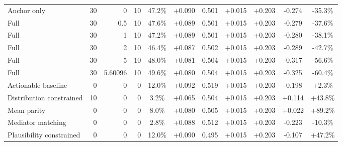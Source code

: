 \begin{table}[htbp]
\begin{tabular}{lrrrccccccc}
Anchor only & 30 & 0 & 10 & 47.2\% & +0.090 & 0.501 & +0.015 & +0.203 & -0.274 & -35.3\% \\
Full & 30 & 0.5 & 10 & 47.6\% & +0.089 & 0.501 & +0.015 & +0.203 & -0.279 & -37.6\% \\
Full & 30 & 1 & 10 & 47.2\% & +0.089 & 0.501 & +0.015 & +0.203 & -0.280 & -38.1\% \\
Full & 30 & 2 & 10 & 46.4\% & +0.087 & 0.502 & +0.015 & +0.203 & -0.289 & -42.7\% \\
Full & 30 & 5 & 10 & 48.0\% & +0.081 & 0.504 & +0.015 & +0.203 & -0.317 & -56.6\% \\
Full & 30 & 5.60096 & 10 & 49.6\% & +0.080 & 0.504 & +0.015 & +0.203 & -0.325 & -60.4\% \\
Actionable baseline & 0 & 0 & 0 & 12.0\% & +0.092 & 0.519 & +0.015 & +0.203 & -0.198 & +2.3\% \\
Distribution constrained & 10 & 0 & 0 & 3.2\% & +0.065 & 0.504 & +0.015 & +0.203 & +0.114 & +43.8\% \\
Mean parity & 0 & 0 & 0 & 8.0\% & +0.080 & 0.505 & +0.015 & +0.203 & +0.022 & +89.2\% \\
Mediator matching & 0 & 0 & 0 & 2.8\% & +0.088 & 0.512 & +0.015 & +0.203 & -0.223 & -10.3\% \\
Plausibility constrained & 0 & 0 & 0 & 12.0\% & +0.090 & 0.495 & +0.015 & +0.203 & -0.107 & +47.2\% \\
\bottomrule
\end{tabular}
\end{table}